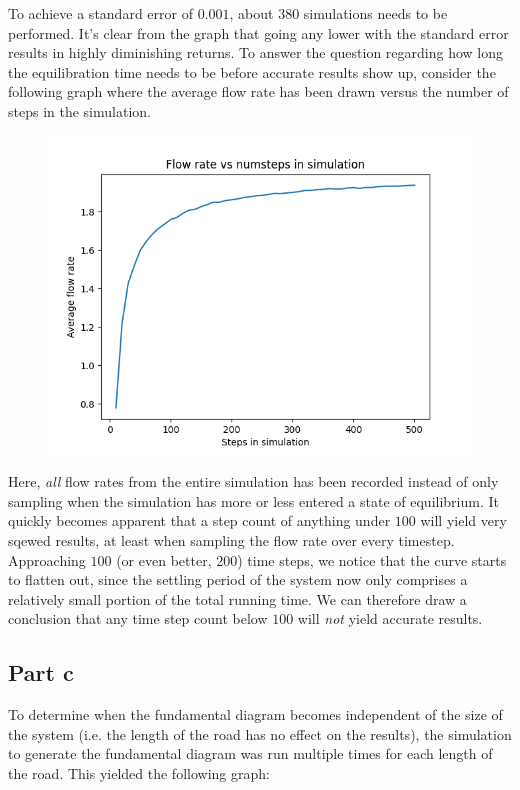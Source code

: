 \documentclass[a4paper,12pt]{article}
\begin{document}
\FloatBarrier

To achieve a standard error of $0.001$, about 380 simulations needs to be performed. It's clear from the graph that
going any lower with the standard error results in highly diminishing returns.
To answer the question regarding how long the equilibration time needs to be before accurate results show up,
consider the following graph where the average flow rate has been drawn versus the number of steps in the simulation.

\begin{figure}[!ht]
  \centering
  \includegraphics[scale=0.48]{img/2_2b_flowrate_nsteps.png}
\end{figure}

Here, \emph{all} flow rates from the entire simulation has been recorded instead of only sampling when the simulation
has more or less entered a state of equilibrium. It quickly becomes apparent that a step count of anything under $100$
will yield very sqewed results, at least when sampling the flow rate over every timestep. Approaching $100$ (or even
better, $200$) time steps, we notice that the curve starts to flatten out, since the settling period of the system now
only comprises a relatively small portion of the total running time. We can therefore draw a conclusion that any
time step count below $100$ will \emph{not} yield accurate results.

\subsection*{Part c}

To determine when the fundamental diagram becomes independent of the size of the system (i.e. the length of the road
has no effect on the results), the simulation to generate the fundamental diagram was run multiple times for each
length of the road. This yielded the following graph:
\end{document}

